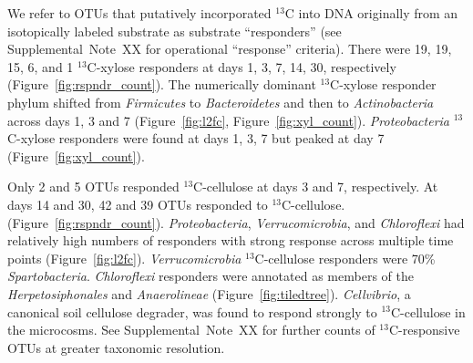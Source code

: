 We refer to OTUs that putatively incorporated $^{13}$C into DNA originally from
an isotopically labeled substrate as  substrate ``responders'' (see
Supplemental~Note~XX for operational ``response'' criteria). There were 19, 19,
15, 6, and 1 $^{13}$C-xylose responders at days 1, 3, 7, 14, 30, respectively
(Figure~\ref{fig:rspndr_count}).
The numerically dominant $^{13}$C-xylose responder phylum shifted from
\textit{Firmicutes} to \textit{Bacteroidetes} and then to
\textit{Actinobacteria} across days 1, 3 and 7 (Figure~\ref{fig:l2fc},
Figure~\ref{fig:xyl_count}). \textit{Proteobacteria} $^{13}$C-xylose responders
were found at days 1, 3, 7 but peaked at day 7 (Figure~\ref{fig:xyl_count}). 

Only 2 and 5 OTUs responded $^{13}$C-cellulose at days 3 and 7, respectively.
At days 14 and 30, 42 and 39 OTUs responded to $^{13}$C-cellulose.
(Figure~\ref{fig:rspndr_count}). 
\textit{Proteobacteria}, \textit{Verrucomicrobia}, and \textit{Chloroflexi} had
relatively high numbers of responders with strong response across multiple time
points (Figure~\ref{fig:l2fc}). \textit{Verrucomicrobia} $^{13}$C-cellulose
responders were 70\% \textit{Spartobacteria}. \textit{Chloroflexi} responders
were annotated as members of the \textit{Herpetosiphonales} and
\textit{Anaerolineae} (Figure~\ref{fig:tiledtree}). \textit{Cellvibrio},
a canonical soil cellulose degrader, was found to respond strongly to
$^{13}$C-cellulose in the microcosms. See Supplemental~Note~XX for further
counts of $^{13}$C-responsive OTUs at greater taxonomic resolution.

